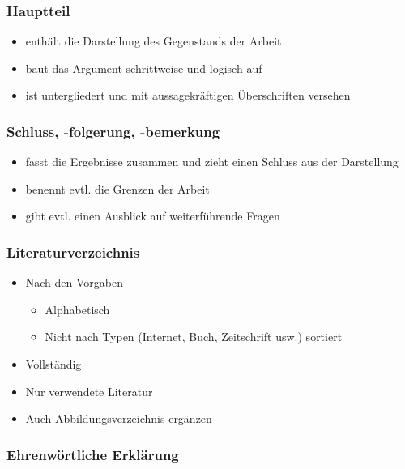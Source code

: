 \documentclass[ 12pt,
                titlepage,
                parskip=half,
                version=first,
                bibliography=totocnumbered,
                final,
                listof=totoc]{scrartcl}
\begin{document}
\subsubsection{Hauptteil}

\begin{itemize}
    \item enthält die Darstellung des Gegenstands der Arbeit
    \item baut das Argument schrittweise und logisch auf
    \item ist untergliedert und mit aussagekräftigen Überschriften versehen
\end{itemize}

\subsubsection{Schluss, -folgerung, -bemerkung}

\begin{itemize}
    \item fasst die Ergebnisse zusammen und zieht einen Schluss aus der
    Darstellung
    \item benennt evtl. die Grenzen der Arbeit
    \item gibt evtl. einen Ausblick auf weiterführende Fragen
\end{itemize}

\subsubsection{Literaturverzeichnis}

\begin{itemize}
    \item Nach den Vorgaben
\begin{itemize}
    \item Alphabetisch
    \item Nicht nach Typen (Internet, Buch, Zeitschrift usw.) sortiert
\end{itemize}
    \item Vollständig
    \item Nur verwendete Literatur
    \item Auch Abbildungsverzeichnis ergänzen
\end{itemize}

\subsubsection{Ehrenwörtliche Erklärung}
\end{document}
